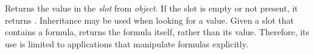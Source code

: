 Returns the value in the {\it slot} from {\it object}.  If the slot is
empty or not present, it returns \value{nil}.  Inheritance may be used when
looking for a value.  Given a slot that contains a formula, 
returns the formula itself, rather than its value.  Therefore, its use is
limited to applications that manipulate formulas explicitly.

% 
% 
% 
% 
% 
% 
% 
% 
% 
% 
% 
% 
% 
